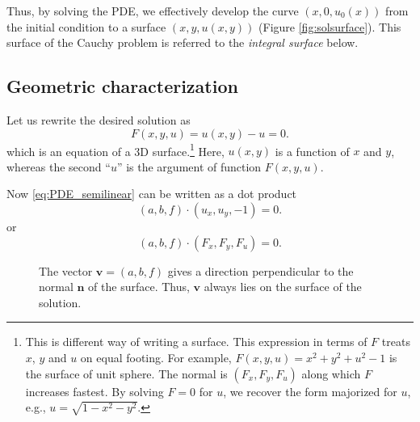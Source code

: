 \documentclass{article}
\begin{document}
Thus, by solving the PDE,
we effectively develop the curve $(x, 0, u_0(x))$
from the initial condition
to a surface $(x, y, u(x, y))$
(Figure \ref{fig:solsurface}).
%
This surface of the Cauchy problem
is referred to the \emph{integral surface} below.


\subsection{Geometric characterization}

Let us rewrite the desired solution as
$$
F(x, y, u) = u(x, y) - u = 0.
$$
which is an equation of a 3D surface.\footnote{
This is different way of writing a surface.
%
This expression in terms of $F$
treats $x$, $y$ and $u$ on equal footing.
For example,
$F(x, y, u) = x^2 + y^2 +u^2 - 1$
is the surface of unit sphere.
The normal is $(F_x, F_y, F_u)$
along which $F$ increases fastest.
%
By solving $F=0$ for $u$,
we recover the form majorized for $u$, e.g.,
$
u = \sqrt{1 - x^2 - y^2}.
$
}
%
Here, $u(x, y)$ is a function of $x$ and $y$,
whereas the second ``$u$'' is the argument
of function $F(x, y, u)$.

Now \eqref{eq:PDE_semilinear} can be written as
a dot product
$$
(a, b, f) \cdot (u_x, u_y, -1) = 0.
$$
or
\begin{equation}
(a, b, f) \cdot (F_x, F_y, F_u) = 0.
\label{eq:dotproduct1}
\end{equation}

\begin{figure}[h]
  \centering
  \caption{
    \label{fig:characteristic_direction}
    The vector $\mathbf v = (a, b, f)$ gives
    a direction perpendicular to the normal $\mathbf n$
    of the surface.
    Thus, $\mathbf v$ always lies on the surface of the solution.
  }
\end{figure}
\end{document}
